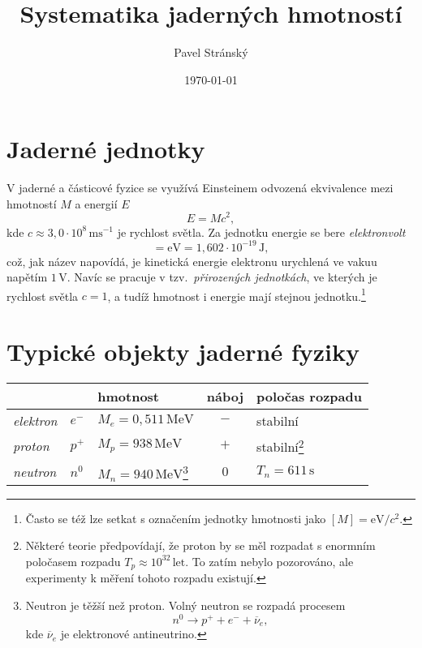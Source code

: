 \documentclass[a4paper,12pt,oneside]{article}
\def\unit#1{\,\mathrm{#1}}
\def\c{,\!}                             %
\theoremstyle{red}
\begin{document}
\title{Systematika jaderných hmotností}
\date{\today}
\author{Pavel Stránský}

\maketitle

\section{Jaderné jednotky}
V jaderné a částicové fyzice se využívá Einsteinem odvozená ekvivalence mezi hmotností $M$ a energií $E$
\begin{equation}
    E=Mc^{2},
\end{equation}
kde $c\approx3\c0\cdot10^8\unit{ms^{-1}}$ je rychlost světla.
Za jednotku energie se bere \emph{elektronvolt}
\begin{equation}
    [E]=\mathrm{eV}=1\c602\cdot10^{-19}\unit{J},
\end{equation}
což, jak název napovídá, je kinetická energie elektronu urychlená ve vakuu napětím $1\,\mathrm{V}$.
Navíc se pracuje v tzv.~\emph{přirozených jednotkách}, ve kterých je rychlost světla $c=1$, a tudíž hmotnost i energie mají stejnou jednotku.\footnote{
    Často se též lze setkat s  označením jednotky hmotnosti jako $[M]=\mathrm{eV}/c^{2}$.
}

\section{Typické objekty jaderné fyziky}
\begin{minipage}{0.95\linewidth}
\begin{tabular}{|l|l|l|c|l|}
    \hline
    & & {\color{red}\bf hmotnost} & náboj & poločas rozpadu \\
    \hline
    \emph{elektron} & $e^{-}$ & $M_{e}=0\c511\unit{MeV}$ & $-$ & stabilní \\
    \emph{proton} & $p^{+}$ & {\color{red}$M_{p}=938\unit{MeV}$} & $+$ & stabilní\footnote{
        Některé teorie předpovídají, že proton by se měl rozpadat s enormním poločasem rozpadu $T_{p}\approx10^{32}\unit{let}$.
        To zatím nebylo pozorováno, ale experimenty k měření tohoto rozpadu existují.
        } \\
    \emph{neutron} & $n^{0}$ & {\color{red}$M_{n}=940\unit{MeV}$}\footnote{
        Neutron je těžší než proton. Volný neutron se rozpadá procesem
        \begin{equation}
            \label{eq:beta}
            n^{0}\rightarrow p^{+}+e^{-}+\overline{\nu}_{e},
        \end{equation}
        kde $\overline{\nu}_{e}$ je elektronové antineutrino.
        } & $0$ & $T_{n}=611\unit{s}$ \\
    \hline
\end{tabular}
\end{minipage}
\end{document}
